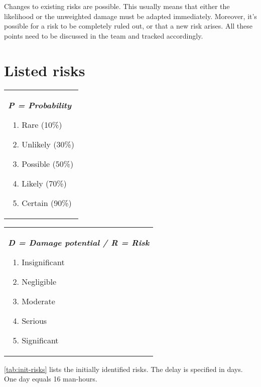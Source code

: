 Changes to existing risks are possible. This usually means that either the likelihood or
the unweighted damage must be adapted immediately. Moreover, it's possible for a risk to
be completely ruled out, or that a new risk arises. All these points need to be discussed in
the team and tracked accordingly.

\section{Listed risks}
\begin{tabular}[t]{@{}>{\raggedright}p{}}
  \textbf{\textit{P = Probability}}
  \begin{enumerate}[topsep=0pt,itemsep=-2pt,leftmargin=13pt]
  \item Rare (10\%)
  \item Unlikely (30\%)
  \item Possible (50\%)
  \item Likely (70\%)
  \item Certain (90\%)
  \end{enumerate}
\end{tabular}
\begin{tabular}[t]{@{}>{\raggedright}p{}@{}}
  \textbf{\textit{D = Damage potential  / R = Risk}}
  \begin{enumerate}[topsep=0pt,itemsep=-2pt,leftmargin=13pt]
  \item Insignificant
  \item Negligible
  \item Moderate
  \item Serious
  \item Significant
  \end{enumerate}
\end{tabular}

\autoref{tab:init-risks} lists the initially identified risks. The delay is
specified in days. One day equals 16 man-hours.

